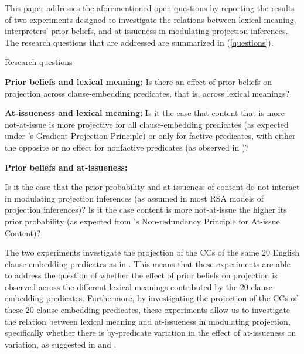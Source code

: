 \documentclass[11pt,fleqn]{article}
\newcommand{\6}{\mbox{$[\hspace*{-.6mm}[$}}
\newcommand{\9}{\mbox{$]\hspace*{-.6mm}]$}}
\newcommand{\citepos}[1]{\citeauthor{#1}'s \citeyear{#1}}
\begin{document}
\medskip

This paper addresses the aforementioned open questions by reporting the results of two experiments designed to investigate the relations between lexical meaning, interpreters' prior beliefs, and at-issueness in modulating projection inferences. The research questions that are addressed are summarized in (\ref{questions}). 

\begin{exe}
\ex\label{questions} Research questions
\begin{xlist}
 {\bf Prior beliefs and lexical meaning:} Is there an effect of prior beliefs on projection across clause-embedding predicates, that is, across lexical meanings? 

 {\bf At-issueness and lexical meaning:} Is it the case that content that is more not-at-issue is more projective for all clause-embedding predicates (as expected under \citepos{tbd-variability} Gradient Projection Principle) or only for factive predicates, with either the opposite or no effect for nonfactive predicates (as observed in \citealt{djaerv-bacovcin-salt27,djaerv-bacovcin2020,mahler-etal2020})?

 {\bf Prior beliefs and at-issueness:} 
\begin{xlist}
 Is it the case that the prior probability and at-issueness of content do not interact in modulating projection inferences  (as assumed in most RSA models of projection inferences)? 
 Is it the case content is more not-at-issue the higher its prior probability (as expected from \citepos{tonhauser-etal-eval} Non-redundancy Principle for At-issue Content)? 
\end{xlist}
\end{xlist}
\end{exe}

The two experiments investigate the projection of the CCs of the same 20 English clause-embedding predicates as in \citealt{degen-tonhauser-openmind,degen-tonhauser-language}. This means that these experiments are able to address the question of whether the effect of prior beliefs on projection is observed across the different lexical meanings contributed by the 20 clause-embedding predicates. Furthermore, by investigating the projection of the CCs of these 20 clause-embedding predicates, these experiments allow us to investigate the relation between lexical meaning and at-issueness in modulating projection, specifically whether there is by-predicate variation in the effect of at-issueness on variation, as suggested in \citealt{djaerv-bacovcin-salt27,djaerv-bacovcin2020} and \citealt{mahler-etal2020}. 
\end{document}
